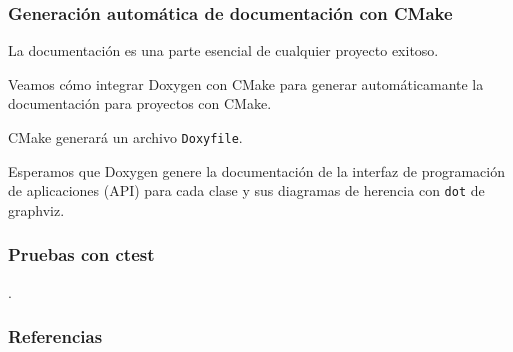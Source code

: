 \begin{frame}[fragile]
	\frametitle{Generación automática de documentación con CMake}
	La documentación es una parte esencial de cualquier proyecto
	exitoso.

	Veamos cómo integrar Doxygen con CMake para generar
	automáticamante la documentación para proyectos con CMake.

	CMake generará un archivo \lstinline{Doxyfile}.

	Esperamos que Doxygen genere la documentación de la interfaz de
	programación de aplicaciones (API) para cada clase y sus
	diagramas de herencia con \lstinline{dot} de graphviz.
\end{frame}

\begin{frame}[fragile]
	\frametitle{Pruebas con ctest}
	.
\end{frame}





\begin{frame}\transblindsvertical
	\frametitle{Referencias}
\end{frame}


